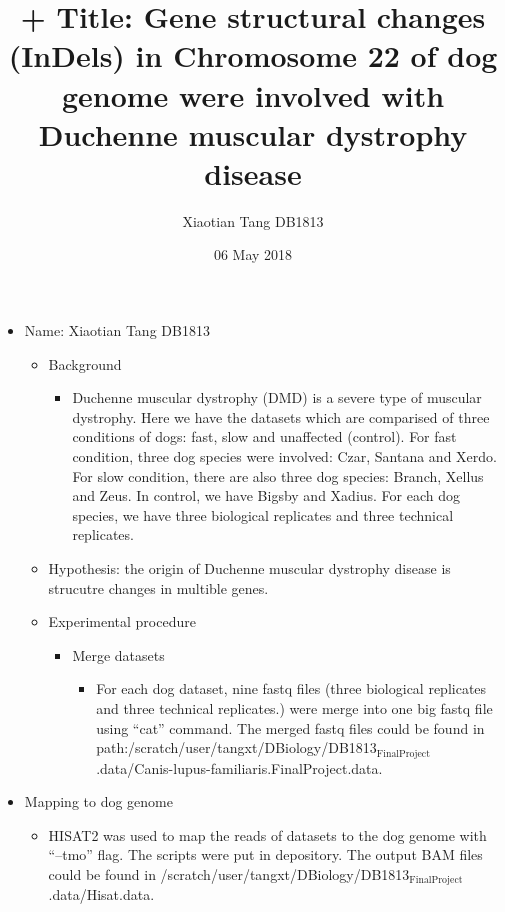 \documentclass[11pt]{article}
\title{+ Title: Gene structural changes (InDels) in Chromosome 22 of dog genome were involved with Duchenne muscular dystrophy disease}
\author{Xiaotian Tang   DB1813}
\date{06 May 2018}
\begin{document}
\maketitle

\setcounter{tocdepth}{3}
\tableofcontents
\vspace*{1cm}
\begin{itemize}
\item Name: Xiaotian Tang DB1813

\begin{itemize}
\item Background

\begin{itemize}
\item Duchenne muscular dystrophy (DMD) is a severe type of muscular dystrophy. Here we have the datasets which are comparised of three conditions of dogs: 
    fast, slow and unaffected (control). For fast condition, three dog species were involved: Czar, Santana and Xerdo. For slow condition,
    there are also three dog species: Branch, Xellus and Zeus. In control, we have Bigsby and Xadius. For each dog species, we have three biological 
    replicates and three technical replicates.
\end{itemize}

\item Hypothesis: the origin of Duchenne muscular dystrophy disease is strucutre changes in multible genes.
\item Experimental procedure

\begin{itemize}
\item Merge datasets

\begin{itemize}
\item For each dog dataset, nine fastq files (three biological replicates and three technical replicates.) were merge into one big fastq file using
    ``cat'' command. The merged fastq files could be found in path:/scratch/user/tangxt/DBiology/DB1813$_{\mathrm{FinalProject}}$.data/Canis-lupus-familiaris.FinalProject.data.
\end{itemize}

\end{itemize}

\end{itemize}

\item Mapping to dog genome

\begin{itemize}
\item HISAT2 was used to map the reads of datasets to the dog genome with ``--tmo'' flag. The scripts were put in depository. The output BAM files could be found in /scratch/user/tangxt/DBiology/DB1813$_{\mathrm{FinalProject}}$.data/Hisat.data.
\end{itemize}


\end{itemize}
\end{document}
